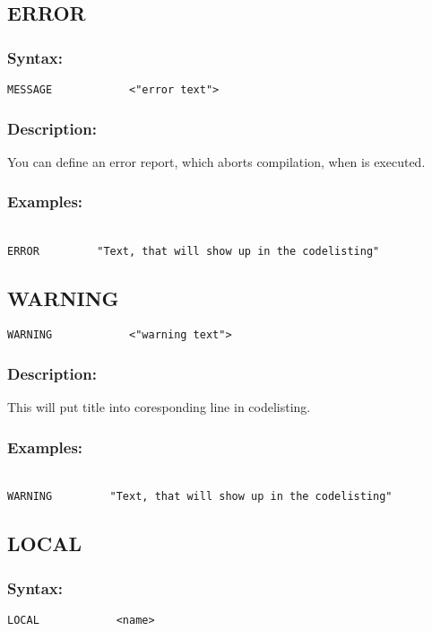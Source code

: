     \subsection{ERROR}
        \subsubsection{Syntax:}
            \verb'MESSAGE            <"error text">'

        \subsubsection{Description:}
        You can define an error report, which aborts compilation, when is executed.

        \subsubsection{Examples:}
            {
                ~\\
                \usecodefont
                \verb'ERROR         "Text, that will show up in the codelisting"'
            }

    \subsection{WARNING}
            \verb'WARNING            <"warning text">'

        \subsubsection{Description:}
            This will put title into coresponding line in codelisting.

        \subsubsection{Examples:}
            {
                ~\\
                \usecodefont
                \verb'WARNING         "Text, that will show up in the codelisting"'
            }

    \subsection{LOCAL}
        \subsubsection{Syntax:}
            \verb'LOCAL            <name>'

